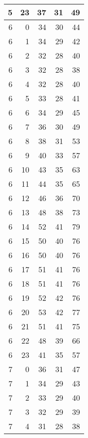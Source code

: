 \begin{longtable}{|r|r|r|r|r|}
    5     & 23    & 37    & 31    & 49 \\\hline
    6     & 0     & 34    & 30    & 44 \\\hline
    6     & 1     & 34    & 29    & 42 \\\hline
    6     & 2     & 32    & 28    & 40 \\\hline
    6     & 3     & 32    & 28    & 38 \\\hline
    6     & 4     & 32    & 28    & 40 \\\hline
    6     & 5     & 33    & 28    & 41 \\\hline
    6     & 6     & 34    & 29    & 45 \\\hline
    6     & 7     & 36    & 30    & 49 \\\hline
    6     & 8     & 38    & 31    & 53 \\\hline
    6     & 9     & 40    & 33    & 57 \\\hline
    6     & 10    & 43    & 35    & 63 \\\hline
    6     & 11    & 44    & 35    & 65 \\\hline
    6     & 12    & 46    & 36    & 70 \\\hline
    6     & 13    & 48    & 38    & 73 \\\hline
    6     & 14    & 52    & 41    & 79 \\\hline
    6     & 15    & 50    & 40    & 76 \\\hline
    6     & 16    & 50    & 40    & 76 \\\hline
    6     & 17    & 51    & 41    & 76 \\\hline
    6     & 18    & 51    & 41    & 76 \\\hline
    6     & 19    & 52    & 42    & 76 \\\hline
    6     & 20    & 53    & 42    & 77 \\\hline
    6     & 21    & 51    & 41    & 75 \\\hline
    6     & 22    & 48    & 39    & 66 \\\hline
    6     & 23    & 41    & 35    & 57 \\\hline
    7     & 0     & 36    & 31    & 47 \\\hline
    7     & 1     & 34    & 29    & 43 \\\hline
    7     & 2     & 33    & 29    & 40 \\\hline
    7     & 3     & 32    & 29    & 39 \\\hline
    7     & 4     & 31    & 28    & 38 \\\hline

\end{longtable}
